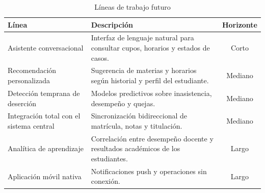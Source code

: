 \begin{table}[H]
\centering
\caption{Líneas de trabajo futuro}
\label{tab:trabajo-futuro}
\small
\begin{tabularx}{\textwidth}{@{}p{3.9cm} X c@{}}
\toprule
\rowcolor{azulClaro}
\textbf{Línea} & \textbf{Descripción} & \textbf{Horizonte} \\
\midrule
Asistente conversacional &
  Interfaz de lenguaje natural para consultar cupos, horarios y estados de casos. &
  Corto \\
Recomendación personalizada &
  Sugerencia de materias y horarios según historial y perfil del estudiante. &
  Mediano \\
Detección temprana de deserción &
  Modelos predictivos sobre inasistencia, desempeño y quejas. &
  Mediano \\
Integración total con el sistema central &
  Sincronización bidireccional de matrícula, notas y titulación. &
  Mediano \\
Analítica de aprendizaje &
  Correlación entre desempeño docente y resultados académicos de los estudiantes. &
  Largo \\
Aplicación móvil nativa &
  Notificaciones push y operaciones sin conexión. &
  Largo \\
\bottomrule
\end{tabularx}
\end{table}